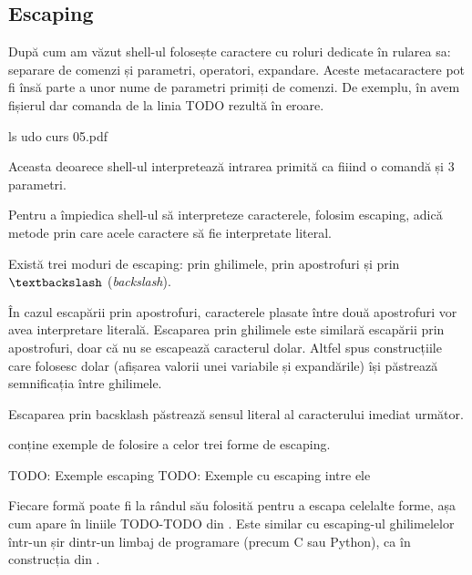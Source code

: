 \subsection{Escaping}
\label{sec:cli-escaping}

După cum am văzut shell-ul folosește caractere cu roluri dedicate în rularea sa:
separare de comenzi și parametri, operatori, expandare. Aceste metacaractere pot
fi însă parte a unor nume de parametri primiți de comenzi. De exemplu, în  avem
fișierul  dar comanda de la linia TODO rezultă în eroare.

\begin{screen}[caption={Caracterul spațiu în numele unui fișier},label={lst:cli:space-error}]
ls udo curs 05.pdf
\end{screen}

Aceasta deoarece shell-ul interpretează intrarea primită ca fiiind o comandă și
3 parametri.

Pentru a împiedica shell-ul să interpreteze caracterele, folosim escaping, adică
metode prin care acele caractere să fie interpretate literal.

Există trei moduri de escaping: prin ghilimele, prin apostrofuri și prin
\texttt{$\textbackslash$} (\textit{backslash}).

În cazul escapării prin apostrofuri, caracterele plasate între două apostrofuri
vor avea interpretare literală. Escaparea prin ghilimele este similară escapării
prin apostrofuri, doar că nu se escapează caracterul dolar. Altfel spus
construcțiile care folosesc dolar (afișarea valorii unei variabile și
expandările) își păstrează semnificația între ghilimele.

Escaparea prin bacsklash păstrează sensul literal al caracterului imediat
următor.

 conține exemple de folosire a celor trei forme de escaping.

\begin{screen}[caption={Forme de escaping în shell},label={lst:cli:escaping}]
TODO: Exemple escaping
TODO: Exemple cu escaping intre ele
\end{screen}

Fiecare formă poate fi la rândul său folosită pentru a escapa celelalte forme, așa cum apare în liniile TODO-TODO din . Este similar cu escaping-ul ghilimelelor într-un șir dintr-un limbaj de programare (precum C sau Python), ca în construcția din .

